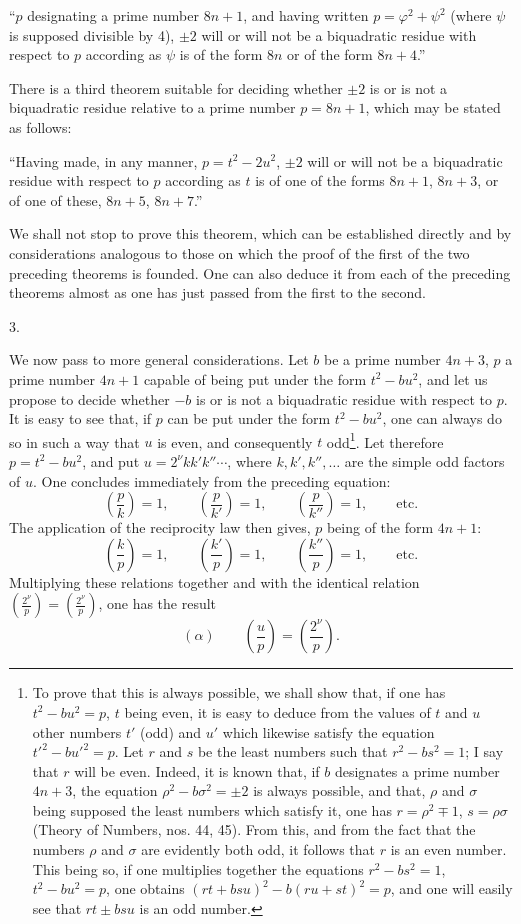 \documentclass[11pt]{article}
\newcommand{\leg}[2]{\left(\frac{#1}{#2}\right)}
\newcommand{\unitid}[1]{\hypertarget{#1}{}}
\begin{document}
\unitid{dirichlet.v1.p04a.en.thm.004}“$p$ designating a prime number $8n+1$, and having written $p=\varphi^2+\psi^2$ (where $\psi$ is supposed divisible by 4), $\pm2$ will or will not be a biquadratic residue with respect to $p$ according as $\psi$ is of the form $8n$ or of the form $8n+4$.”

\unitid{dirichlet.v1.p04a.en.par.016}There is a third theorem suitable for deciding whether $\pm2$ is or is not a biquadratic residue relative to a prime number $p=8n+1$, which may be stated as follows:

\unitid{dirichlet.v1.p04a.en.thm.005}“Having made, in any manner, $p=t^2-2u^2$, $\pm2$ will or will not be a biquadratic residue with respect to $p$ according as $t$ is of one of the forms $8n+1$, $8n+3$, or of one of these, $8n+5$, $8n+7$.”

\unitid{dirichlet.v1.p04a.en.par.017}We shall not stop to prove this theorem, which can be established directly and by considerations analogous to those on which the proof of the first of the two preceding theorems is founded. One can also deduce it from each of the preceding theorems almost as one has just passed from the first to the second.

\begin{center}3.\end{center}

\unitid{dirichlet.v1.p04a.en.par.018}We now pass to more general considerations. Let $b$ be a prime number $4n+3$, $p$ a prime number $4n+1$ capable of being put under the form $t^2-bu^2$, and let us propose to decide whether $-b$ is or is not a biquadratic residue with respect to $p$. It is easy to see that, if $p$ can be put under the form $t^2-bu^2$, one can always do so in such a way that $u$ is even, and consequently $t$ odd\footnote{To prove that this is always possible, we shall show that, if one has $t^2-bu^2=p$, $t$ being even, it is easy to deduce from the values of $t$ and $u$ other numbers $t'$ (odd) and $u'$ which likewise satisfy the equation $t'^2-bu'^2=p$. Let $r$ and $s$ be the least numbers such that $r^2-bs^2=1$; I say that $r$ will be even. Indeed, it is known that, if $b$ designates a prime number $4n+3$, the equation $\rho^2-b\sigma^2=\pm2$ is always possible, and that, $\rho$ and $\sigma$ being supposed the least numbers which satisfy it, one has $r=\rho^2\mp1$, $s=\rho\sigma$ (Theory of Numbers, nos. 44, 45). From this, and from the fact that the numbers $\rho$ and $\sigma$ are evidently both odd, it follows that $r$ is an even number. This being so, if one multiplies together the equations $r^2-bs^2=1$, $t^2-bu^2=p$, one obtains $(rt+bsu)^2-b(ru+st)^2=p$, and one will easily see that $rt\pm bsu$ is an odd number.}. Let therefore $p=t^2-bu^2$, and put $u=2^\nu kk'k''\cdots$, where $k,k',k'',\ldots$ are the simple odd factors of $u$. One concludes immediately from the preceding equation:
\[
\leg{p}{k}=1,
\qquad \leg{p}{k'}=1,
\qquad \leg{p}{k''}=1,
\qquad \text{etc.}
\]
The application of the reciprocity law then gives, $p$ being of the form $4n+1$:
\[
\leg{k}{p}=1,
\qquad \leg{k'}{p}=1,
\qquad \leg{k''}{p}=1,
\qquad \text{etc.}
\]
Multiplying these relations together and with the identical relation $\leg{2^\nu}{p}=\leg{2^\nu}{p}$, one has the result
\[
(\alpha)\qquad \leg{u}{p}=\leg{2^\nu}{p}.
\]
\end{document}
